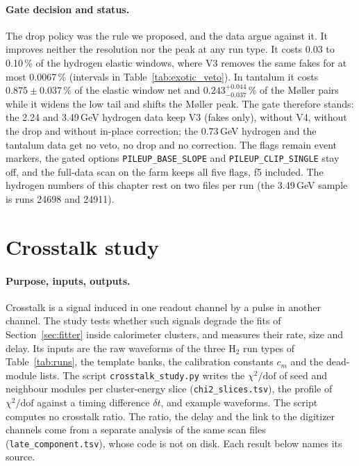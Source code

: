 \documentclass[11pt]{article}
\newcommand{\code}[1]{\texttt{#1}}
\begin{document}
\paragraph{Gate decision and status.} The drop policy was the rule we proposed, and the data argue against it. It improves neither the resolution nor the peak at any run type. It costs 0.03 to 0.10\,\% of the hydrogen elastic windows, where V3 removes the same fakes for at most 0.0067\,\% (intervals in Table~\ref{tab:exotic_veto}). In tantalum it costs $0.875 \pm 0.037\,\%$ of the elastic window net and $0.243^{+0.044}_{-0.037}\,\%$ of the M\o ller pairs while it widens the low tail and shifts the M\o ller peak. The gate therefore stands: the 2.24 and 3.49\,GeV hydrogen data keep V3 (fakes only), without V4, without the drop and without in-place correction; the 0.73\,GeV hydrogen and the tantalum data get no veto, no drop and no correction. The flags remain event markers, the gated options \code{PILEUP\_BASE\_SLOPE} and \code{PILEUP\_CLIP\_SINGLE} stay off, and the full-data scan on the farm keeps all five flags, f5 included. The hydrogen numbers of this chapter rest on two files per run (the 3.49\,GeV sample is runs 24698 and 24911).
\clearpage

\section{Crosstalk study}
\label{sec:xtalk}

\paragraph{Purpose, inputs, outputs.} Crosstalk is a signal induced in one readout channel by a pulse in another channel. The study tests whether such signals degrade the fits of Section~\ref{sec:fitter} inside calorimeter clusters, and measures their rate, size and delay. Its inputs are the raw waveforms of the three H$_2$ run types of Table~\ref{tab:runs}, the template banks, the calibration constants $c_m$ and the dead-module lists. The script \code{crosstalk\_study.py} writes the $\chi^2/\mathrm{dof}$ of seed and neighbour modules per cluster-energy slice (\code{chi2\_slices.tsv}), the profile of $\chi^2/\mathrm{dof}$ against a timing difference $\delta t$, and example waveforms. The script computes no crosstalk ratio. The ratio, the delay and the link to the digitizer channels come from a separate analysis of the same scan files (\code{late\_component.tsv}), whose code is not on disk. Each result below names its source.
\end{document}
